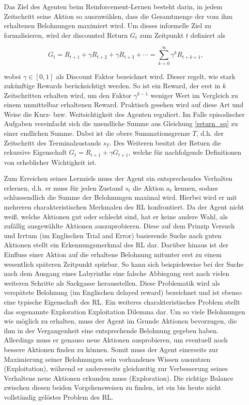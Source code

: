 Das Ziel des Agenten beim Reinforcement-Lernen besteht darin, in jedem Zeitschritt seine Aktion so auszuwählen, dass die Gesamtmenge der vom ihm erhaltenen Belohnungen maximiert wird. Um dieses informelle Ziel zu formalisieren, wird der discounted Return $G_t$ zum Zeitpunkt $t$ definiert als

\begin{equation}
  G_t = R_{t+1} + \gamma R_{t+2} + \gamma R_{t+3} + \dotsb = \sum_{k=0}^{\infty} \gamma^k R_{t+k+1},
  \label{return_eq}
\end{equation}

wobei $\gamma \in [0, 1]$ als Discount Faktor bezeichnet wird. Dieser regelt, wie stark zukünftige Rewards berücksichtigt werden. So ist ein Reward, der erst in $k$ Zeitschritten erhalten wird, um den Faktor $\gamma^{k-1}$ weniger Wert im Vergleich zu einem unmittelbar erhaltenen Reward. Praktisch gesehen wird auf diese Art und Weise die Kurz- bzw. Weitsichtigkeit des Agenten reguliert. Im Falle episodischer Aufgaben vereinfacht sich die unendliche Summe aus Gleichung \eqref{return_eq} zu einer endlichen Summe. Dabei ist die obere Summationsgrenze $T$, d.h. der Zeitschritt des Terminalzustands $s_T$. Des Weiteren besitzt der Return die rekursive Eigenschaft $G_t = R_{t+1} + \gamma G_{t+1}$, welche für nachfolgende Definitionen von erheblicher Wichtigkeit ist.

Zum Erreichen seines Lernziels muss der Agent ein entsprechendes Verhalten erlernen, d.h. er muss für jeden Zustand $s_t$ die Aktion $a_t$ kennen, sodass schlussendlich die Summe der Belohnungen maximal wird. Hierbei wird er mit mehreren charakteristischen Merkmalen des RL konfrontiert. Da der Agent nicht weiß, welche Aktionen gut oder schlecht sind, hat er keine andere Wahl, als zufällig ausgewählte Aktionen auszuprobieren. Diese auf dem Prinzip Versuch und Irrtum (im Englischen Trial and Error) basierende Suche nach guten Aktionen stellt ein Erkennungsmerkmal des RL dar. Darüber hinaus ist der Einfluss einer Aktion auf die erhaltene Belohnung mitunter erst zu einem wesentlich späteren Zeitpunkt spürbar. So kann sich beispielsweise bei der Suche nach dem Ausgang eines Labyrinths eine falsche Abbiegung erst nach vielen weiteren Schritte als Sackgasse herausstellen. Diese Problematik wird als verspätete Belohnung (im Englischen delayed reward) bezeichnet und ist ebenso eine typische Eigenschaft des RL. Ein weiteres charakteristisches Problem stellt das sogenannte Exploration Exploitation Dilemma dar. Um so viele Belohnungen wie möglich zu erhalten, muss der Agent im Grunde Aktionen bevorzugen, die ihm in der Vergangenheit eine entsprechende Belohnung gegeben haben. Allerdings muss er genauso neue Aktionen ausprobieren, um eventuell noch bessere Aktionen finden zu können. Somit muss der Agent einerseits zur Maximierung seiner Belohnungen sein vorhandenes Wissen ausnutzen (Exploitation), während er andererseits gleichzeitig zur Verbesserung seines Verhaltens neue Aktionen erkunden muss (Exploration). Die richtige Balance zwischen diesen beiden Vorgehensweisen zu finden, ist ein bis heute nicht vollständig gelöstes Problem des RL.

